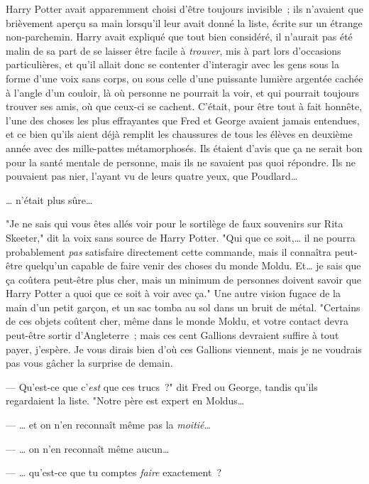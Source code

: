 \later

Harry Potter avait apparemment choisi d'être toujours invisible~; ils n'avaient que brièvement aperçu sa main lorsqu'il leur avait donné la liste, écrite sur un étrange non-parchemin. Harry avait expliqué que tout bien considéré, il n'aurait pas été malin de sa part de se laisser être facile à \emph{trouver}, mis à part lors d'occasions particulières, et qu'il allait donc se contenter d'interagir avec les gens sous la forme d'une voix sans corps, ou sous celle d'une puissante lumière argentée cachée à l'angle d'un couloir, là où personne ne pourrait la voir, et qui pourrait toujours trouver ses amis, où que ceux-ci se cachent. C'était, pour être tout à fait honnête, l'une des choses les plus effrayantes que Fred et George avaient jamais entendues, et ce bien qu'ils aient déjà remplit les chaussures de tous les élèves en deuxième année avec des mille-pattes métamorphosés. Ils étaient d'avis que ça ne serait bon pour la santé mentale de personne, mais ils ne savaient pas quoi répondre. Ils ne pouvaient pas nier, l'ayant vu de leurs quatre yeux, que Poudlard…

… n'était plus sûre…

"Je ne sais qui vous êtes allés voir pour le sortilège de faux souvenirs sur Rita Skeeter," dit la voix sans source de Harry Potter. "Qui que ce soit,… il ne pourra probablement \emph{pas} satisfaire directement cette commande, mais il connaîtra peut-être quelqu'un capable de faire venir des choses du monde Moldu. Et… je sais que ça coûtera peut-être plus cher, mais un minimum de personnes doivent savoir que Harry Potter a quoi que ce soit à voir avec ça." Une autre vision fugace de la main d'un petit garçon, et un sac tomba au sol dans un bruit de métal. "Certains de ces objets coûtent cher, même dans le monde Moldu, et votre contact devra peut-être sortir d'Angleterre~; mais ces cent Gallions devraient suffire à tout payer, j'espère. Je vous dirais bien d'où ces Gallions viennent, mais je ne voudrais pas vous gâcher la surprise de demain.

--- Qu'est-ce que c'\emph{est} que ces trucs~?" dit Fred ou George, tandis qu'ils regardaient la liste. "Notre père est expert en Moldus…

--- … et on n'en reconnaît même pas la \emph{moitié}…

--- … on n'en reconnaît même aucun…

--- … qu'est-ce que tu comptes \emph{faire} exactement~?

